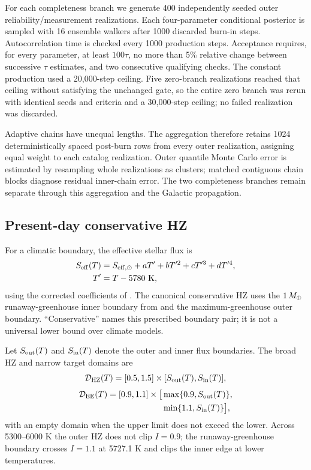 For each completeness branch we generate 400 independently seeded outer
reliability/measurement realizations. Each four-parameter conditional
posterior is sampled with 16 ensemble walkers after 1000 discarded burn-in
steps. Autocorrelation time is checked every 1000 production steps. Acceptance
requires, for every parameter, at least $100\tau$, no more than 5\% relative
change between successive $\tau$ estimates, and two consecutive qualifying
checks. The constant production used a 20,000-step ceiling. Five zero-branch
realizations reached that ceiling without satisfying the unchanged gate, so
the entire zero branch was rerun with identical seeds and criteria and a
30,000-step ceiling; no failed realization was discarded.

Adaptive chains have unequal lengths. The aggregation therefore retains 1024
deterministically spaced post-burn rows from every outer realization, assigning
equal weight to each catalog realization. Outer quantile Monte Carlo error is
estimated by resampling whole realizations as clusters; matched contiguous
chain blocks diagnose residual inner-chain error. The two completeness
branches remain separate through this aggregation and the Galactic propagation.

\subsection{Present-day conservative HZ}

For a climatic boundary, the effective stellar flux is
\begin{align}
 S_{\rm eff}(T)={}&S_{{\rm eff},\odot}+aT'
 +bT'^2+cT'^3+dT'^4,\nonumber\\
 T'={}&T-5780\ {\rm K},
 \label{eq:kopparapu}
\end{align}
using the corrected coefficients of \citet{Kopparapu2013,Kopparapu2013Erratum}. The canonical conservative HZ uses the
$1\,M_{\oplus}$ runaway-greenhouse inner boundary from \citet{Kopparapu2014} and
the maximum-greenhouse outer boundary. ``Conservative'' names this prescribed
boundary pair; it is not a universal lower bound over climate models.

Let $S_{\rm out}(T)$ and $S_{\rm in}(T)$ denote the outer and inner flux
boundaries. The broad HZ and narrow target domains are
\begin{equation}
 \mathcal{D}_{\rm HZ}(T)
 =[0.5,1.5]\times[S_{\rm out}(T),S_{\rm in}(T)],
 \label{eq:d_hz}
\end{equation}
\begin{align}
 \mathcal{D}_{\rm EE}(T)=[0.9,1.1]\times
 \big[&\max\{0.9,S_{\rm out}(T)\},\nonumber\\
      &\min\{1.1,S_{\rm in}(T)\}\big],
 \label{eq:d_ee}
\end{align}
with an empty domain when the upper limit does not exceed the lower. Across
5300--6000 K the outer HZ does not clip $I=0.9$; the runaway-greenhouse
boundary crosses $I=1.1$ at 5727.1 K and clips the inner edge at lower
temperatures.

